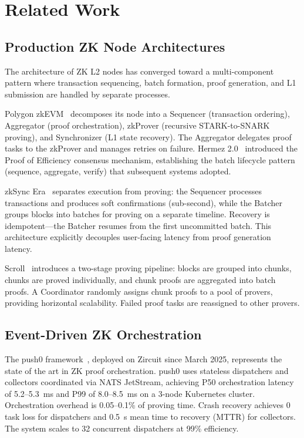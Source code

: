 
\section{Related Work}

\subsection{Production ZK Node Architectures}

The architecture of ZK L2 nodes has converged toward a multi-component
pattern where transaction sequencing, batch formation, proof generation,
and L1 submission are handled by separate processes.

Polygon zkEVM~\cite{polygon2024architecture} decomposes its node into a
Sequencer (transaction ordering), Aggregator (proof orchestration), zkProver
(recursive STARK-to-SNARK proving), and Synchronizer (L1 state recovery). The
Aggregator delegates proof tasks to the zkProver and manages retries on
failure. Hermez 2.0~\cite{hermez2023deepdive} introduced the Proof of
Efficiency consensus mechanism, establishing the batch lifecycle pattern
(sequence, aggregate, verify) that subsequent systems adopted.

zkSync Era~\cite{zksync2025lifecycle, zksync2025server} separates execution
from proving: the Sequencer processes transactions and produces soft
confirmations (sub-second), while the Batcher groups blocks into batches for
proving on a separate timeline. Recovery is idempotent---the Batcher resumes
from the first uncommitted batch. This architecture explicitly decouples
user-facing latency from proof generation latency.

Scroll~\cite{scroll2023architecture, scroll2025euclid} introduces a
two-stage proving pipeline: blocks are grouped into chunks, chunks are
proved individually, and chunk proofs are aggregated into batch proofs. A
Coordinator randomly assigns chunk proofs to a pool of provers, providing
horizontal scalability. Failed proof tasks are reassigned to other provers.

\subsection{Event-Driven ZK Orchestration}

The push0 framework~\cite{push0_2025orchestration}, deployed on Zircuit
since March 2025, represents the state of the art in ZK proof orchestration.
push0 uses stateless dispatchers and collectors coordinated via NATS
JetStream, achieving P50 orchestration latency of 5.2--5.3~ms and P99 of
8.0--8.5~ms on a 3-node Kubernetes cluster. Orchestration overhead is
0.05--0.1\% of proving time. Crash recovery achieves 0 task loss for
dispatchers and 0.5~s mean time to recovery (MTTR) for collectors. The
system scales to 32 concurrent dispatchers at 99\% efficiency.

